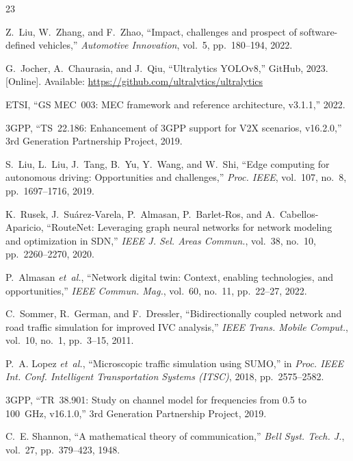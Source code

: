 \documentclass[10pt,conference]{IEEEtran}
\begin{document}
\begin{thebibliography}{23}

Z.~Liu, W.~Zhang, and F.~Zhao,
``Impact, challenges and prospect of software-defined vehicles,''
\textit{Automotive Innovation}, vol.~5, pp.~180--194, 2022.

G.~Jocher, A.~Chaurasia, and J.~Qiu,
``Ultralytics YOLOv8,'' GitHub, 2023.
[Online]. Available: \url{https://github.com/ultralytics/ultralytics}

ETSI,
``GS MEC~003: MEC framework and reference architecture, v3.1.1,'' 2022.

3GPP,
``TS~22.186: Enhancement of 3GPP support for V2X scenarios, v16.2.0,''
3rd Generation Partnership Project, 2019.

S.~Liu, L.~Liu, J.~Tang, B.~Yu, Y.~Wang, and W.~Shi,
``Edge computing for autonomous driving: Opportunities and challenges,''
\textit{Proc. IEEE}, vol.~107, no.~8, pp.~1697--1716, 2019.

K.~Rusek, J.~Su\'arez-Varela, P.~Almasan, P.~Barlet-Ros, and
A.~Cabellos-Aparicio,
``RouteNet: Leveraging graph neural networks for network modeling and
optimization in SDN,''
\textit{IEEE J. Sel. Areas Commun.}, vol.~38, no.~10, pp.~2260--2270, 2020.

P.~Almasan \textit{et~al.},
``Network digital twin: Context, enabling technologies, and opportunities,''
\textit{IEEE Commun. Mag.}, vol.~60, no.~11, pp.~22--27, 2022.

C.~Sommer, R.~German, and F.~Dressler,
``Bidirectionally coupled network and road traffic simulation for improved
IVC analysis,''
\textit{IEEE Trans. Mobile Comput.}, vol.~10, no.~1, pp.~3--15, 2011.

P.~A. Lopez \textit{et~al.},
``Microscopic traffic simulation using SUMO,''
in \textit{Proc. IEEE Int. Conf. Intelligent Transportation Systems
(ITSC)}, 2018, pp.~2575--2582.

3GPP,
``TR~38.901: Study on channel model for frequencies from 0.5 to 100~GHz,
v16.1.0,'' 3rd Generation Partnership Project, 2019.

C.~E. Shannon,
``A mathematical theory of communication,''
\textit{Bell Syst. Tech. J.}, vol.~27, pp.~379--423, 1948.


\end{thebibliography}
\end{document}
